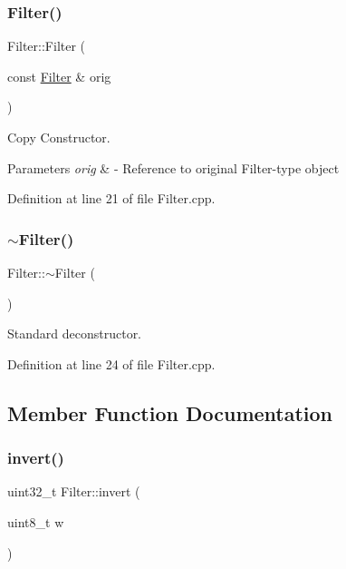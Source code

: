 \subsubsection{\texorpdfstring{Filter()}{Filter()}\hspace{0.1cm}{\footnotesize\ttfamily [2/2]}}
{\footnotesize\ttfamily Filter\+::\+Filter (\begin{DoxyParamCaption}\item[{const \mbox{\hyperlink{classFilter}{Filter}} \&}]{orig }\end{DoxyParamCaption})}



Copy Constructor. 


\begin{DoxyParams}{Parameters}
{\em orig} & -\/ Reference to original Filter-\/type object \\
\hline
\end{DoxyParams}


Definition at line 21 of file Filter.\+cpp.

\mbox{\label{classFilter_a502ee334d42eac3edbaf32b599f9c35e}} 
\subsubsection{\texorpdfstring{$\sim$Filter()}{~Filter()}}
{\footnotesize\ttfamily Filter\+::$\sim$\+Filter (\begin{DoxyParamCaption}{ }\end{DoxyParamCaption})\hspace{0.3cm}{\ttfamily [virtual]}}

Standard deconstructor. 

Definition at line 24 of file Filter.\+cpp.



\subsection{Member Function Documentation}
\mbox{\label{classFilter_a55f792b3f87991db5a5e666827d6214c}} 
\subsubsection{\texorpdfstring{invert()}{invert()}}
{\footnotesize\ttfamily uint32\+\_\+t Filter\+::invert (\begin{DoxyParamCaption}\item[{uint8\+\_\+t}]{w }\end{DoxyParamCaption})\hspace{0.3cm}{\ttfamily [static]}}



